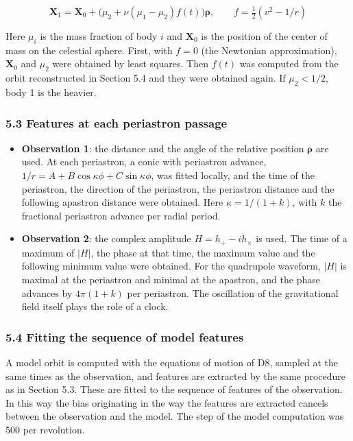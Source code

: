 \documentclass[
  a4paper,
]{article}
\providecommand{\tightlist}{%
  \setlength{\itemsep}{0pt}\setlength{\parskip}{0pt}}
\begin{document}
\[
\mathbf X_1=\mathbf X_0+\bigl(\mu_2+\nu(\mu_1-\mu_2)f(t)\bigr)\boldsymbol\rho,\qquad f=\tfrac12\left(v^2-1/r\right)
\]

Here \(\mu_i\) is the mass fraction of body \(i\) and \(\mathbf X_0\) is
the position of the center of mass on the celestial sphere. First, with
\(f=0\) (the Newtonian approximation), \(\mathbf X_0\) and \(\mu_2\)
were obtained by least squares. Then \(f(t)\) was computed from the
orbit reconstructed in Section 5.4 and they were obtained again. If
\(\mu_2<1/2\), body 1 is the heavier.

\subsubsection{5.3 Features at each periastron
passage}\label{features-at-each-periastron-passage}

\begin{itemize}
\tightlist
\item
  \textbf{Observation 1}: the distance and the angle of the relative
  position \(\boldsymbol\rho\) are used. At each periastron, a conic
  with periastron advance, \(1/r=A+B\cos\kappa\phi+C\sin\kappa\phi\),
  was fitted locally, and the time of the periastron, the direction of
  the periastron, the periastron distance and the following apastron
  distance were obtained. Here \(\kappa=1/(1+k)\), with \(k\) the
  fractional periastron advance per radial period.
\item
  \textbf{Observation 2}: the complex amplitude \(H=h_+-ih_\times\) is
  used. The time of a maximum of \(|H|\), the phase at that time, the
  maximum value and the following minimum value were obtained. For the
  quadrupole waveform, \(|H|\) is maximal at the periastron and minimal
  at the apastron, and the phase advances by \(4\pi(1+k)\) per
  periastron. The oscillation of the gravitational field itself plays
  the role of a clock.
\end{itemize}

\subsubsection{5.4 Fitting the sequence of model
features}\label{fitting-the-sequence-of-model-features}

A model orbit is computed with the equations of motion of D8, sampled at
the same times as the observation, and features are extracted by the
same procedure as in Section 5.3. These are fitted to the sequence of
features of the observation. In this way the bias originating in the way
the features are extracted cancels between the observation and the
model. The step of the model computation was 500 per revolution.
\end{document}
